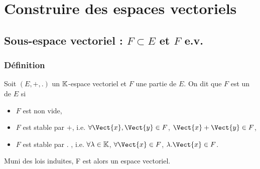 \documentclass{book}
\begin{document}
\begin{Demonstration}
\begin{enumerate}
\end{enumerate}
\end{Demonstration}




\section{Construire des espaces vectoriels}
\subsection{Sous-espace vectoriel : $F\subset E$ et $F$ e.v.}
\subsubsection{Définition}
\begin{DefinitionProposition}
Soit $(E,+,.)$ un $\mathbb{K} $-espace vectoriel et $F$ une partie de $E$.
On dit que $F$ est un  de $E$ si
\begin{itemize}
\item
  $F$ est non vide,
\item
  $F$ est stable par $+$, i.e.   $\forall \Vect{x},\Vect{y} \in F$, $\Vect{x}+\Vect{y}\in F$,
\item
  $F$ est stable par $.$ , i.e.   $\forall \lambda \in \mathbb{K} $, $\forall \Vect{x} \in F$, $\lambda .\Vect{x}\in F$.
\end{itemize}
Muni des lois induites, F est alors un espace vectoriel.
\end{DefinitionProposition}
\end{document}
